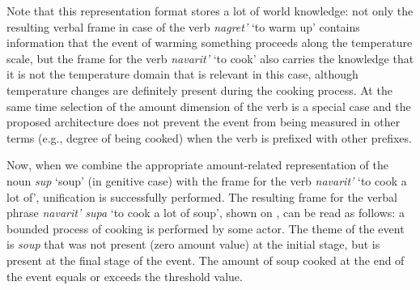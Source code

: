 Note that this representation format stores a lot of world knowledge: not only the resulting verbal frame in case of the verb \textit{nagret'} `to warm up' contains information that the event of warming something proceeds along the temperature scale, but the frame for the verb \textit{navarit'} `to cook' also carries the knowledge that it is not the temperature domain that is relevant in this case, although temperature changes are definitely present during the cooking process. At the same time selection of the amount dimension of the verb is a special case and the proposed architecture does not prevent the event from being measured in other terms (e.g., degree of being cooked) when the verb is prefixed with other prefixes.

Now, when we combine the appropriate amount-related representation of the noun \textit{sup} `soup' (in genitive case) with the frame for the verb \textit{navarit'} `to cook a lot of', unification is successfully performed. The resulting frame for the verbal phrase \textit{navarit' supa} `to cook a lot of soup', shown on , can be read as follows: a bounded process of cooking is performed by some actor. The theme of the event is \textit{soup} that was not present (zero amount value) at the initial stage, but is present at the final stage of the event. The amount of soup cooked at the end of the event equals or exceeds the threshold value. 

